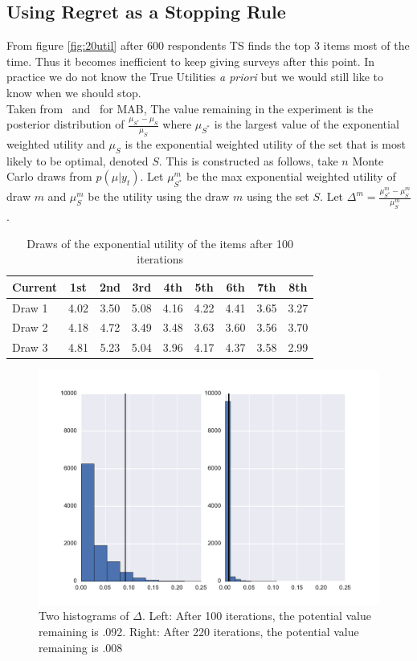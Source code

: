 \documentclass[nonblindrev]{informs3}
\begin{document}
\subsection{Using Regret as a Stopping Rule}
From figure \ref{fig:20util} after 600 respondents TS finds the top 3 items most of the time. Thus it becomes inefficient to keep giving surveys after this point. In practice we do not know the True Utilities \textit{a priori} but we would still like to know when we should stop.\\
Taken from~\cite{scott2015multi} and~\cite{scott2010modern} for MAB, The value remaining in the experiment is the posterior distribution of $\frac{\mu_{S^*}-\mu_{S}}{\mu_{S}}$ where $\mu_{S^*}$ is the largest value of the exponential weighted utility and $\mu_{S}$ is the exponential weighted utility of the set that is most likely to be optimal, denoted $S$. This is constructed as follows, take $n$ Monte Carlo draws from $p(\mu|y_t)$. Let $\mu_{S^*}^{m}$ be the max exponential weighted utility of draw $m$ and $\mu_{S}^{m}$ be the utility using the draw $m$ using the set $S$. Let $\Delta^{m}=\frac{\mu^m_{S^*}-\mu^m_{S}}{\mu^m_{S}}$.\\
\begin{table}
\begin{center}
\begin{tabular}{l | c c c c c c c c}
Current & 1st &  2nd  &  3rd  &  4th &  5th & 6th & 7th &  8th \\
\hline
Draw 1 & 4.02 &  3.50 &  5.08 & 4.16&  4.22 & 4.41 & 3.65 &  3.27 \\
Draw 2 &4.18 & 4.72 & 3.49 & 3.48 & 3.63 & 3.60 & 3.56 &  3.70 \\
Draw 3 &4.81 & 5.23 & 5.04 &  3.96 &  4.17 & 4.37 &  3.58 & 2.99 \\ 
\end{tabular}
\end{center}
\caption{Draws of the exponential utility of the items after 100 iterations}
\label{table:data}
\end{table}
\begin{figure}
\includegraphics[width=1\linewidth]{plots/valremhist.pdf}
\caption{Two histograms of $\Delta$. Left: After 100 iterations, the potential value remaining is .092. Right: After 220 iterations, the potential value remaining is .008}
\label{fig:data}
\end{figure}
\end{document}
